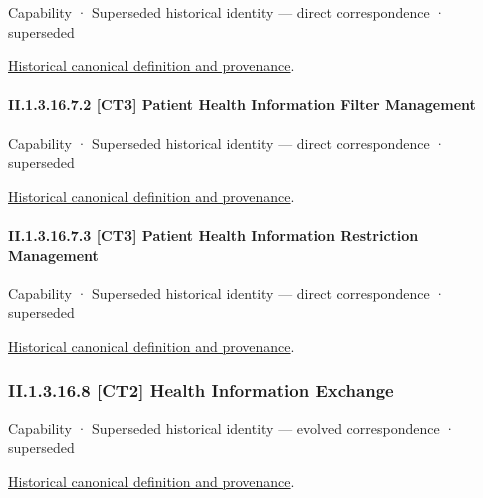 \label{element:07cf507f183d4905a7ad2adbb8555df5}
{\small Capability · Superseded historical identity — direct correspondence · superseded}\par
\href{../../../../continuum/strategy/capability/07cf507f183d4905a7ad2adbb8555df5.md}{Historical canonical definition and provenance}.\par
\paragraph*{II.1.3.16.7.2 [CT3] Patient Health Information Filter Management}
\label{navigation:II.1.3.16.7.2}

\label{element:589f192797454d9e8960fb63774e5e9c}
{\small Capability · Superseded historical identity — direct correspondence · superseded}\par
\href{../../../../continuum/strategy/capability/589f192797454d9e8960fb63774e5e9c.md}{Historical canonical definition and provenance}.\par
\paragraph*{II.1.3.16.7.3 [CT3] Patient Health Information Restriction Management}
\label{navigation:II.1.3.16.7.3}

\label{element:5ad91d045474435a96b560e66ff7de05}
{\small Capability · Superseded historical identity — direct correspondence · superseded}\par
\href{../../../../continuum/strategy/capability/5ad91d045474435a96b560e66ff7de05.md}{Historical canonical definition and provenance}.\par
\subsubsection*{II.1.3.16.8 [CT2] Health Information Exchange}
\label{navigation:II.1.3.16.8}

\label{element:330d1c43856a4322a2e9f331b1a5ed20}
{\small Capability · Superseded historical identity — evolved correspondence · superseded}\par
\href{../../../../continuum/strategy/capability/330d1c43856a4322a2e9f331b1a5ed20.md}{Historical canonical definition and provenance}.\par
